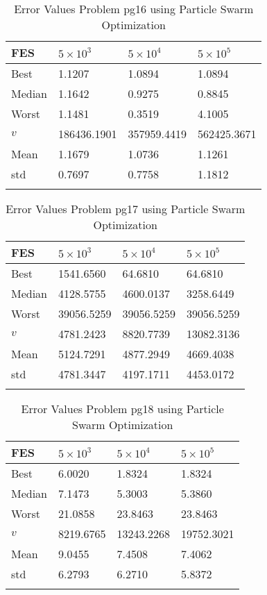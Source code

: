 \documentclass[10pt, a4paper]{book}
\begin{document}
\begin{center}
\begin{longtable}{l l l l}
FES & $5 \times 10^{3}$ & $5 \times 10^{4}$ & $5 \times 10^{5}$ \\
\hline
Best & 1.1207 & 1.0894 & 1.0894 \\
Median & 1.1642 & 0.9275 & 0.8845 \\
Worst & 1.1481 & 0.3519 & 4.1005 \\
$v$ & 186436.1901 & 357959.4419 & 562425.3671 \\
Mean & 1.1679 & 1.0736 & 1.1261 \\
std & 0.7697 & 0.7758 & 1.1812 \\
\caption{ Error Values Problem pg16 using Particle Swarm Optimization }
\end{longtable}
\end{center}

\begin{center}
\begin{longtable}{l l l l}
FES & $5 \times 10^{3}$ & $5 \times 10^{4}$ & $5 \times 10^{5}$ \\
\hline
Best & 1541.6560 & 64.6810 & 64.6810 \\
Median & 4128.5755 & 4600.0137 & 3258.6449 \\
Worst & 39056.5259 & 39056.5259 & 39056.5259 \\
$v$ & 4781.2423 & 8820.7739 & 13082.3136 \\
Mean & 5124.7291 & 4877.2949 & 4669.4038 \\
std & 4781.3447 & 4197.1711 & 4453.0172 \\
\caption{ Error Values Problem pg17 using Particle Swarm Optimization }
\end{longtable}
\end{center}

\begin{center}
\begin{longtable}{l l l l}
FES & $5 \times 10^{3}$ & $5 \times 10^{4}$ & $5 \times 10^{5}$ \\
\hline
Best & 6.0020 & 1.8324 & 1.8324 \\
Median & 7.1473 & 5.3003 & 5.3860 \\
Worst & 21.0858 & 23.8463 & 23.8463 \\
$v$ & 8219.6765 & 13243.2268 & 19752.3021 \\
Mean & 9.0455 & 7.4508 & 7.4062 \\
std & 6.2793 & 6.2710 & 5.8372 \\
\caption{ Error Values Problem pg18 using Particle Swarm Optimization }
\end{longtable}
\end{center}
\end{document}
